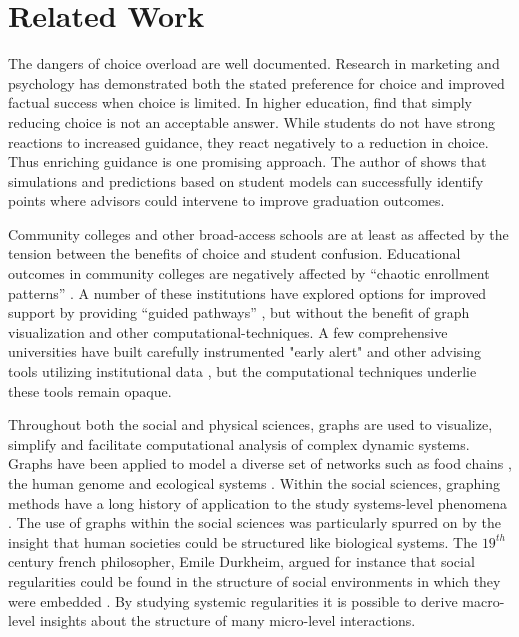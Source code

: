 \documentclass{sigchi}
\begin{document}
\section{Related Work}


The dangers of choice overload are well documented. Research in marketing \cite{botti2006} and psychology
\cite{schwartz2004paradox iyengar2000} has demonstrated both the stated preference for
choice and improved factual success when choice is limited. In higher education, \cite{bake2018} find that simply reducing choice is not an acceptable answer. While students do not have strong reactions to increased guidance, they react negatively to a reduction in choice. Thus enriching guidance is one promising
approach. The author of \cite{slim2016} shows that simulations and
predictions based on student models can successfully identify points
where advisors could intervene to improve graduation outcomes.

Community colleges and other broad-access schools are at least as affected by the tension between the benefits of choice and student confusion. Educational
outcomes in community colleges are negatively affected by ``chaotic
enrollment patterns'' \cite{crosta2014, bail2015, scot2015}. A number of these institutions have explored options for improved support by providing ``guided pathways'' \cite{jenkins2013}, but without the benefit of graph visualization and other computational-techniques. A few comprehensive universities have built carefully instrumented "early alert" and other advising tools utilizing institutional data \cite{fletcher2016integrated}, but the computational techniques underlie these tools remain opaque. 

Throughout both the social and physical sciences, graphs are used to visualize, simplify and facilitate computational analysis of complex dynamic systems. Graphs have been applied to model a diverse set of networks such as food chains \cite{Hall1993}, the human genome \cite{Pevzner1989} and ecological systems \cite{Fortin2012}. Within the social sciences, graphing methods have a long history of application to the study systems-level phenomena \cite{Borgatti2009}. The use of graphs within the social sciences was particularly spurred on by the insight that human societies could be structured like biological systems. The $19^{th}$ century french philosopher, Emile Durkheim, argued for instance that social regularities could be found in the structure of social environments in which they were embedded \cite{Durkheim1951}. By studying systemic regularities it is possible to derive macro-level insights about the structure of many micro-level interactions. 
\end{document}
